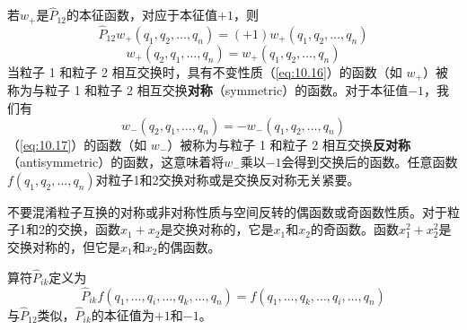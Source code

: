     若$w_+$是$\hat{P}_{12}$的本征函数，对应于本征值$+1$，则
    \begin{equation*}
        \hat{P}_{12}w_{+}\left(q_1, q_2, \ldots, q_n\right) = \left(+1\right)w_{+}\left(q_1, q_2, \ldots, q_n\right)
    \end{equation*}
    \begin{equation}
        \boxed{
            w_{+}\left(q_{2}, q_{1}, \ldots, q_{n}\right) = w_{+}\left(q_{1}, q_{2}, \ldots, q_{n}\right)
        }
        \label{eq:10.16}
    \end{equation}
    当粒子 1 和粒子 2 相互交换时，具有不变性质（\ref{eq:10.16}）的函数（如 $w_+$）被称为与粒子 1 和粒子 2 相互交换\textbf{对称}（symmetric）的函数。对于本征值$-1$，我们有
    \begin{equation}
        \boxed{
            w_{-}\left(q_{2}, q_{1}, \ldots, q_{n}\right) = -w_{-}\left(q_{1}, q_{2}, \ldots, q_{n}\right)
        }
        \label{eq:10.17}
    \end{equation}
    （\ref{eq:10.17}）的函数（如 $w_-$）被称为与粒子 1 和粒子 2 相互交换\textbf{反对称}（antisymmetric）的函数，这意味着将$w_-$乘以$-1$会得到交换后的函数。任意函数$f\left(q_1, q_2, \ldots, q_n\right)$对粒子1和2交换对称或是交换反对称无关紧要。

    不要混淆粒子互换的对称或非对称性质与空间反转的偶函数或奇函数性质。对于粒子1和2的交换，函数$x_1 + x_2$是交换对称的，它是$x_1$和$x_2$的奇函数。函数$x_1^2 + x_2^2$是交换对称的，但它是$x_1$和$x_2$的偶函数。

    算符$\hat{P}_{ik}$定义为
    \begin{equation}
        \hat{P}_{ik} f \left(q_1, \ldots, q_i, \ldots, q_k, \ldots, q_n\right) = f \left(q_1, \ldots, q_k, \ldots, q_i, \ldots, q_n\right)
        \label{eq:10.18}
    \end{equation}
    与$\hat{P}_{12}$类似，$\hat{P}_{ik}$的本征值为$+1$和$-1$。

